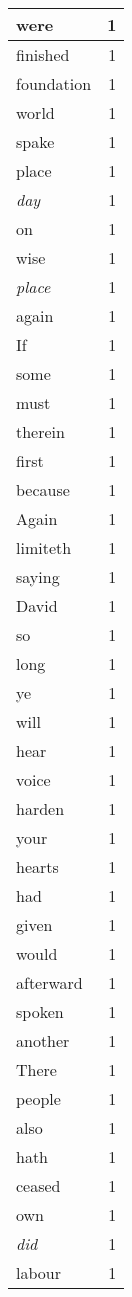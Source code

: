 \begin{center}
\begin{longtable}{l|r}
were & 1\\ \hline 
finished & 1\\ \hline 
foundation & 1\\ \hline 
world & 1\\ \hline 
spake & 1\\ \hline 
place & 1\\ \hline 
\emph{day} & 1\\ \hline 
on & 1\\ \hline 
wise & 1\\ \hline 
\emph{place} & 1\\ \hline 
again & 1\\ \hline 
If & 1\\ \hline 
some & 1\\ \hline 
must & 1\\ \hline 
therein & 1\\ \hline 
first & 1\\ \hline 
because & 1\\ \hline 
Again & 1\\ \hline 
limiteth & 1\\ \hline 
saying & 1\\ \hline 
David & 1\\ \hline 
so & 1\\ \hline 
long & 1\\ \hline 
ye & 1\\ \hline 
will & 1\\ \hline 
hear & 1\\ \hline 
voice & 1\\ \hline 
harden & 1\\ \hline 
your & 1\\ \hline 
hearts & 1\\ \hline 
had & 1\\ \hline 
given & 1\\ \hline 
would & 1\\ \hline 
afterward & 1\\ \hline 
spoken & 1\\ \hline 
another & 1\\ \hline 
There & 1\\ \hline 
people & 1\\ \hline 
also & 1\\ \hline 
hath & 1\\ \hline 
ceased & 1\\ \hline 
own & 1\\ \hline 
\emph{did} & 1\\ \hline 
labour & 1\\ \hline 

\end{longtable}
\end{center}
